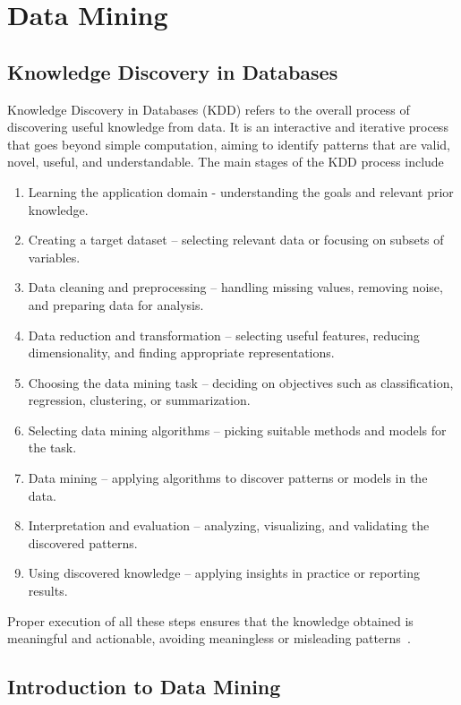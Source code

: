 \chapter{Data Mining}

\section{Knowledge Discovery in Databases}

Knowledge Discovery in Databases (KDD) refers to the overall process of discovering useful knowledge from data. It is an interactive and iterative process that goes beyond simple computation, aiming to identify patterns that are valid, novel, useful, and understandable.
The main stages of the KDD process include

\begin{enumerate}
\item Learning the application domain - understanding the goals and relevant prior knowledge.
\item Creating a target dataset – selecting relevant data or focusing on subsets of variables.
\item Data cleaning and preprocessing – handling missing values, removing noise, and preparing data for analysis.
\item Data reduction and transformation – selecting useful features, reducing dimensionality, and finding appropriate representations.
\item Choosing the data mining task – deciding on objectives such as classification, regression, clustering, or summarization.
\item Selecting data mining algorithms – picking suitable methods and models for the task.
\item Data mining – applying algorithms to discover patterns or models in the data.
\item Interpretation and evaluation – analyzing, visualizing, and validating the discovered patterns.
\item Using discovered knowledge – applying insights in practice or reporting results.
\end{enumerate}

Proper execution of all these steps ensures that the knowledge obtained is meaningful and actionable, avoiding meaningless or misleading patterns~\parencite{Fayyad1996}.

\section{Introduction to Data Mining}

